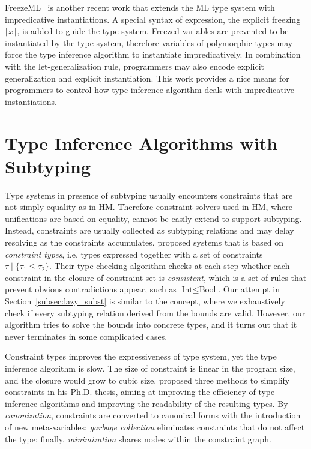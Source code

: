 FreezeML~\citep{FreezeML} is another recent work that extends the ML type system
with impredicative instantiations.
A special syntax of expression, the explicit freezing $\lceil x \rceil$,
is added to guide the type system.
Freezed variables are prevented to be instantiated by the type system,
therefore variables of polymorphic types may force the type inference algorithm
to instantiate impredicatively.
In combination with the let-generalization rule, programmers may also encode
explicit generalization and explicit instantiation.
This work provides a nice means for programmers to control how type inference algorithm
deals with impredicative instantiations.

\section{Type Inference Algorithms with Subtyping}
Type systems in presence of subtyping usually encounters constraints that
are not simply equality as in HM.
Therefore constraint solvers used in HM, where unifications are based on equality,
cannot be easily extend to support subtyping.
Instead, constraints are usually collected as subtyping relations
and may delay resolving as the constraints accumulates.
\citet{EIFRIG1995,Eifrig1995sound} proposed systems that is based on
\emph{constraint types}, i.e. types expressed together with a set of constraints
$\tau \mid \{\overline{\tau_1 \le \tau_2}\}$.
Their type checking algorithm checks at each step whether
each constraint in the closure of constraint set is \emph{consistent},
which is a set of rules that prevent obvious contradictions appear,
such as $\text{Int} \le \text{Bool}$.
Our attempt in Section~\ref{subsec:lazy_subst} is similar to the concept,
where we exhaustively check if every subtyping relation derived from the bounds are valid.
However, our algorithm tries to solve the bounds into concrete types,
and it turns out that it never terminates in some complicated cases.

Constraint types improves the expressiveness of type system,
yet the type inference algorithm is slow.
The size of constraint is linear in the program size,
and the closure would grow to cubic size.
\citet{pottier1998phd} proposed three methods to simplify constraints in his Ph.D. thesis,
aiming at improving the efficiency of type inference algorithms and
improving the readability of the resulting types.
By \emph{canonization}, constraints are converted to canonical forms
with the introduction of new meta-variables;
\emph{garbage collection} eliminates constraints that do not affect the type;
finally, \emph{minimization} shares nodes within the constraint graph.

